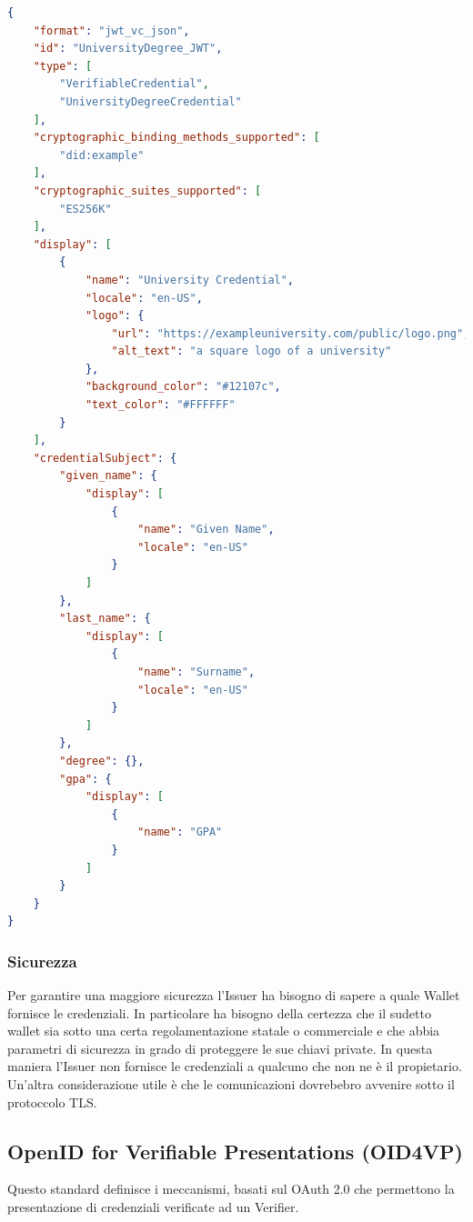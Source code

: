 \begin{lstlisting}[language=json,firstnumber=1]
{
    "format": "jwt_vc_json",
    "id": "UniversityDegree_JWT",
    "type": [
        "VerifiableCredential",
        "UniversityDegreeCredential"
    ],
    "cryptographic_binding_methods_supported": [
        "did:example"
    ],
    "cryptographic_suites_supported": [
        "ES256K"
    ],
    "display": [
        {
            "name": "University Credential",
            "locale": "en-US",
            "logo": {
                "url": "https://exampleuniversity.com/public/logo.png",
                "alt_text": "a square logo of a university"
            },
            "background_color": "#12107c",
            "text_color": "#FFFFFF"
        }
    ],
    "credentialSubject": {
        "given_name": {
            "display": [
                {
                    "name": "Given Name",
                    "locale": "en-US"
                }
            ]
        },
        "last_name": {
            "display": [
                {
                    "name": "Surname",
                    "locale": "en-US"
                }
            ]
        },
        "degree": {},
        "gpa": {
            "display": [
                {
                    "name": "GPA"
                }
            ]
        }
    }
}
\end{lstlisting}

\subsubsection{Sicurezza}
Per garantire una maggiore sicurezza l'Issuer ha bisogno di sapere a quale Wallet fornisce le credenziali.
In particolare ha bisogno della certezza che il sudetto wallet sia sotto una certa regolamentazione statale o commerciale e che abbia parametri di sicurezza
in grado di proteggere le sue chiavi private. In questa maniera l'Issuer non fornisce le credenziali a qualcuno che non ne è il propietario.\\
Un'altra considerazione utile è che le comunicazioni dovrebebro avvenire sotto il protoccolo TLS.

\subsection{OpenID for Verifiable Presentations (OID4VP)}
Questo standard definisce i meccanismi, basati sul OAuth 2.0 che permettono la presentazione di credenziali verificate ad un Verifier.

